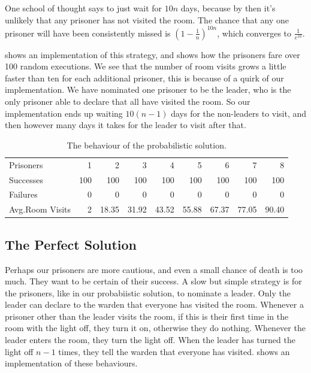 One school of thought says to just wait for $10 n$ days, because by
then it's unlikely that any prisoner has not visited the room.  The
chance that any one prisoner will have been consistently missed is
$\left(1 - \frac{1}{n}\right)^{10n}$, which converges to
$\frac{1}{e^{10}}$.

 shows an implementation of this strategy, and
 shows how the prisoners fare over 100 random
executions.  We see that the number of room visits grows a little
faster than ten for each additional prisoner, this is because of a
quirk of our implementation.  We have nominated one prisoner to be the
leader, who is the only prisoner able to declare that all have visited
the room.  So our implementation ends up waiting $10 (n - 1)$ days for
the non-leaders to visit, and then however many days it takes for the
leader to visit after that.

\begin{table}
  \centering
  \begin{tabular}{lrrrrrrrr} \toprule
    Prisoners          &   1 &   2    &   3    &   4    &   5    &   6    &   7    &   8 \\
    Successes          & 100 & 100    & 100    & 100    & 100    & 100    & 100    & 100 \\
    Failures           &   0 &   0    &   0    &   0    &   0    &   0    &   0    &   0 \\
    Avg.\@ Room Visits &   2 &  18.35 &  31.92 &  43.52 &  55.88 &  67.37 &  77.05 &  90.40 \\ \bottomrule
  \end{tabular}
  \caption{The behaviour of the probabilistic solution.}\label{tbl:100rand}
\end{table}

\subsection{The Perfect Solution}

Perhaps our prisoners are more cautious, and even a small chance of
death is too much.  They want to be certain of their success.  A slow
but simple strategy is for the prisoners, like in our probabiistic
solution, to nominate a leader.  Only the leader can declare to the
warden that everyone has visited the room.  Whenever a prisoner other
than the leader visits the room, if this is their first time in the
room with the light off, they turn it on, otherwise they do nothing.
Whenever the leader enters the room, they turn the light off.  When
the leader has turned the light off $n-1$ times, they tell the warden
that everyone has visited.   shows an
implementation of these behaviours.

